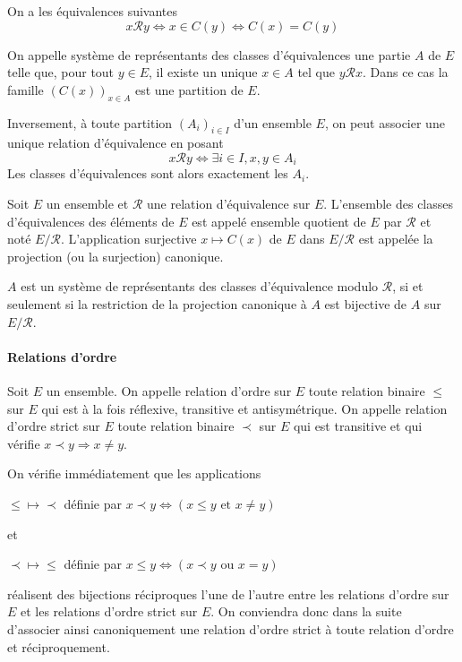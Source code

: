 \begin{rem}
On a les équivalences suivantes
\[
x \mathcal{R} y \Leftrightarrow x \in C(y) \Leftrightarrow C(x) = C(y)
\]
\end{rem}

\begin{de}
On appelle système de représentants des classes
d'équivalences une partie $A$ de $E$ telle que, pour tout $y \in E$, il existe
un unique $x \in A$ tel que $y\mathcal{R}x$. Dans ce cas la famille
$\left(C(x)\right)_{x \in A}$ est une partition de $E$.
\end{de}

\begin{rem}
Inversement, à toute partition $(A_i)_{i \in I}$ d'un ensemble $E$, on peut associer une unique
relation d'équivalence en posant
\[
x\mathcal{R}y \Leftrightarrow \exists i \in I, x,y \in A_i
\]
Les classes d'équivalences sont alors exactement les $A_i$.
\end{rem}

\begin{de}
Soit $E$ un ensemble et $\mathcal{R}$ une relation d'équivalence sur
$E$. L'ensemble des classes d'équivalences des éléments de $E$ est appelé
ensemble quotient de $E$ par $\mathcal{R}$ et noté $E/\mathcal{R}$. L'application surjective
$x \mapsto C(x)$ de $E$ dans $E/\mathcal{R}$ est appelée la
projection (ou la surjection) canonique.
\end{de}

\begin{rem}
$A$ est un système de représentants des classes
d'équivalence modulo $\mathcal{R}$, si et seulement si la restriction de la
projection canonique à $A$ est bijective de $A$ sur $E/\mathcal{R}$.
\end{rem}

\paragraph{Relations d'ordre}

\begin{de}
Soit $E$ un ensemble. On appelle relation d'ordre sur $E$
toute relation binaire $\leqslant$ sur $E$ qui est à la fois réflexive, transitive
et antisymétrique. On appelle relation d'ordre strict sur $E$ toute
relation binaire $\prec$ sur $E$ qui est transitive et qui vérifie $x \prec y \Rightarrow x\neq y$.
\end{de}

\begin{rem}
On vérifie immédiatement que les applications

$\leqslant \mapsto \prec$ définie par $x \prec y \Leftrightarrow (x \leqslant y \text{ et } x \neq y)$

et

$\prec \mapsto \leqslant$ définie par $x \leqslant y \Leftrightarrow (x \prec y \text{ ou } x = y)$

réalisent des bijections réciproques l'une de l'autre entre les
relations d'ordre sur $E$ et les relations d'ordre strict sur $E$. On
conviendra donc dans la suite d'associer ainsi canoniquement une
relation d'ordre strict à toute relation d'ordre et réciproquement.
\end{rem}

